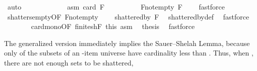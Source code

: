 \begin{isabellebody}
\ auto\isanewline
\ \ \ \ \isamarkupfalse%
\isanewline
\ \ \ \ \ \ \isamarkupfalse%
\ asm{\isacharcolon}{\kern0pt}\ {\isachardoublequoteopen}card\ F\ {\isacharequal}{\kern0pt}\ {}{\isachardoublequoteclose}\isanewline
\ \ \ \ \ \ \isamarkupfalse%
\ F{\isacharunderscore}{\kern0pt}not{\isacharunderscore}{\kern0pt}empty{\isacharcolon}{\kern0pt}\ {\isachardoublequoteopen}F\ {\isasymnoteq}\ {\isacharbraceleft}{\kern0pt}{\isacharbraceright}{\kern0pt}{\isachardoublequoteclose}\ \isamarkupfalse%
\ fastforce\isanewline
\ \ \ \ \ \ \isamarkupfalse%
\ shatters{\isacharunderscore}{\kern0pt}empty{\isacharbrackleft}{\kern0pt}OF\ F{\isacharunderscore}{\kern0pt}not{\isacharunderscore}{\kern0pt}empty{\isacharbrackright}{\kern0pt}\ \isamarkupfalse%
\ {\isachardoublequoteopen}{\isacharbraceleft}{\kern0pt}{\isacharbraceleft}{\kern0pt}{\isacharbraceright}{\kern0pt}{\isacharbraceright}{\kern0pt}\ {\isasymsubseteq}\ shattered{\isacharunderscore}{\kern0pt}by\ F{\isachardoublequoteclose}\ \isamarkupfalse%
\ shattered{\isacharunderscore}{\kern0pt}by{\isacharunderscore}{\kern0pt}def\ \isamarkupfalse%
\ fastforce\isanewline
\ \ \ \ \ \ \isamarkupfalse%
\ card{\isacharunderscore}{\kern0pt}mono{\isacharbrackleft}{\kern0pt}OF\ finite{\isacharunderscore}{\kern0pt}shF\ this{\isacharbrackright}{\kern0pt}\ asm\ \isamarkupfalse%
\ {\isacharquery}{\kern0pt}thesis\ \isamarkupfalse%
\ fastforce\isanewline
\ \ \ \ \isamarkupfalse%
\isanewline
\ \ \isamarkupfalse%
\isanewline
{}\isamarkupfalse%
%
\endisatagproof
{\isafoldproof}%
%
\isadelimproof
%
\endisadelimproof
%
\isadelimdocument
%
\endisadelimdocument
%
\isatagdocument
%
\isamarkuptrue%
%
\endisatagdocument
{\isafolddocument}%
%
\isadelimdocument
%
\endisadelimdocument
%
\begin{isamarkuptext}%
The generalized version immediately implies the Sauer–Shelah Lemma,
      because only  of the subsets of an -item universe have cardinality less than .
      Thus, when , there are not enough sets to be shattered, 

\end{isamarkuptext}
\end{isabellebody}
